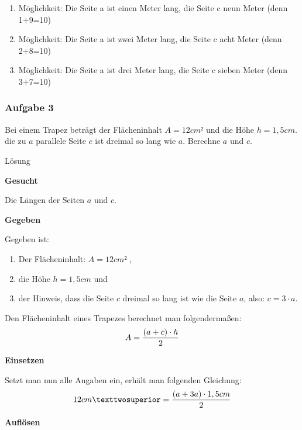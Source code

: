 \documentclass[
  ngerman,
]{book}
\providecommand{\tightlist}{%
  \setlength{\itemsep}{0pt}\setlength{\parskip}{0pt}}
\begin{document}
\begin{enumerate}
\def\labelenumi{\arabic{enumi}.}
\item
  Möglichkeit: Die Seite a ist einen Meter lang, die Seite c neun Meter (denn 1+9=10)
\item
  Möglichkeit: Die Seite a ist zwei Meter lang, die Seite c acht Meter (denn 2+8=10)
\item
  Möglichkeit: Die Seite a ist drei Meter lang, die Seite c sieben Meter (denn 3+7=10)
\end{enumerate}

\hypertarget{section-11}{%
\subsubsection*{}\label{section-11}}

\hypertarget{aufgabe-3-3}{%
\subsubsection*{Aufgabe 3}\label{aufgabe-3-3}}

Bei einem Trapez beträgt der Flächeninhalt \(A=12cm²\) und die Höhe \(h=1,5cm\). die zu \(a\) parallele Seite \(c\) ist dreimal so lang wie \(a\). Berechne \(a\) und \(c\).

Lösung

\textbf{Gesucht}

Die Längen der Seiten \(a\) und \(c\).

\textbf{Gegeben}

Gegeben ist:

\begin{enumerate}
\def\labelenumi{\arabic{enumi}.}
\tightlist
\item
  Der Flächeninhalt: \(A=12cm²\) ,
\item
  die Höhe \(h=1,5cm\) und
\item
  der Hinweis, dass die Seite \(c\) dreimal so lang ist wie die Seite \(a\), also: \(c= 3 \cdot a\).
\end{enumerate}

Den Flächeninhalt eines Trapezes berechnet man folgendermaßen:
\[A = {(a+c) \cdot h \over 2}\]

\textbf{Einsetzen}

Setzt man nun alle Angaben ein, erhält man folgenden Gleichung:
\[12 cm² = {(a+3a) \cdot 1,5cm \over 2}\]

\textbf{Auflösen}
\end{document}
